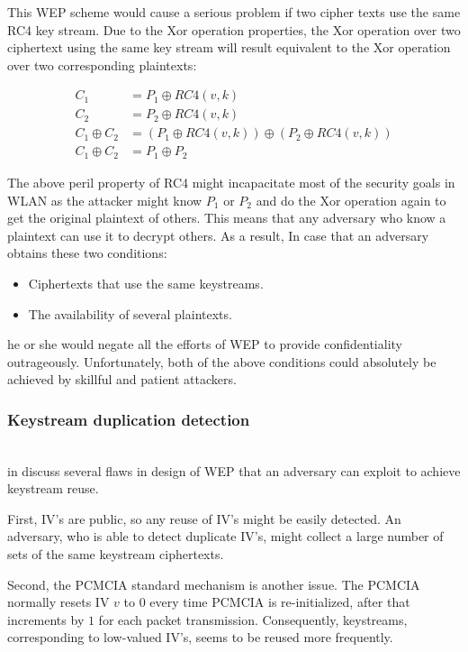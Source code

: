 This \ac{WEP} scheme would cause a serious problem if two cipher texts use the same \ac{RC4} key stream. Due to the \ac{Xor} operation properties, the \ac{Xor} operation over two ciphertext using the same key stream will result equivalent to the \ac{Xor} operation over two corresponding plaintexts:

\begin{align}
	C_1 &= P_1 \oplus RC4(v,k)\\
	C_2 &= P_2 \oplus RC4(v,k) \\
	C_1 \oplus C_2 &= (P_1 \oplus RC4(v,k)) \oplus (P_2 \oplus RC4(v,k))\\
	C_1 \oplus C_2 &= P_1 \oplus P_2
\end{align}

The above peril property of \ac{RC4} might incapacitate most of the security goals in \ac{WLAN} as the attacker might know $P_1$ or $P_2$ and do the \ac{Xor} operation again to get the original plaintext of others. This means that any adversary who know a plaintext can use it to decrypt others. As a result, In case that an adversary obtains these two conditions:
\begin{itemize}
	\item Ciphertexts that use the same keystreams.
	\item The availability of several plaintexts.
\end{itemize}
he or she would negate all the efforts of \ac{WEP} to provide confidentiality  outrageously. Unfortunately, both of the above conditions could absolutely be achieved by skillful and patient attackers.


\subsubsection{Keystream duplication detection}~\\
\citeauthor{borisov2001intercepting} in \cite{borisov2001intercepting} discuss several flaws in design of WEP that an adversary can exploit to achieve keystream reuse. 

First, \ac{IV}'s are public, so any reuse of \ac{IV}'s might be easily detected. An adversary, who is able to detect duplicate \ac{IV}'s, might collect a large number of sets of the same keystream ciphertexts. 

Second, the \ac{PCMCIA} standard mechanism is another issue. The \ac{PCMCIA} normally resets \ac{IV} $v$ to $0$ every time \ac{PCMCIA} is re-initialized, after that increments by $1$ for each packet transmission. Consequently, keystreams, corresponding to low-valued \ac{IV}'s, seems to be reused more frequently. 

